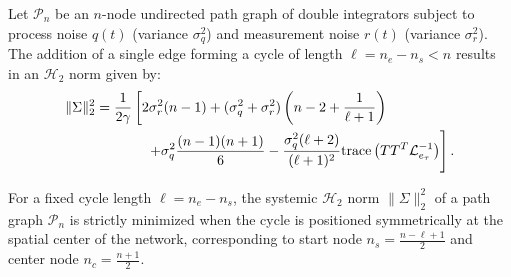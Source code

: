 \documentclass[openright,twoside]{iitbthesis}
\begin{document}
\begin{theo}\label{theo_single}
Let $\mathcal{P}_n$ be an $n$-node undirected path graph of double integrators subject to process noise $q(t)$ (variance $\sigma_q^2$) and measurement noise $r(t)$ (variance $\sigma_r^2$). The addition of a single edge forming a cycle of length $\ell = n_e - n_s < n$ results in an $\mathcal{H}_2$ norm given by:
\begin{equation}\label{eq:ch_RA_single_cycle_norm}
	\begin{aligned}
		\|\Sigma\|_2^2 = \frac{1}{2\gamma} &\left[ 2\sigma_r^2(n-1) + (\sigma_q^2 + \sigma_r^2)\left(n - 2 + \frac{1}{\ell+1}\right)  \right. \\
		&\quad \left. + \sigma_q^2 \frac{(n-1)(n+1)}{6} - \frac{\sigma_q^2(\ell+2)}{(\ell+1)^2} \text{trace}\left( T T^T \mathcal{L}_{e_{\tau}}^{-1} \right) \right].
	\end{aligned}
\end{equation}

\end{theo}
\begin{theo}\label{thm:ch_RA_single_cycle_location}
For a fixed cycle length $\ell = n_e - n_s$, the systemic $\mathcal{H}_2$ norm $\|\Sigma\|_2^2$ of a path graph $\mathcal{P}_n$ is strictly minimized when the cycle is positioned symmetrically at the spatial center of the network, corresponding to start node $n_s = \frac{n-\ell+1}{2}$ and center node $n_c = \frac{n+1}{2}$.
\end{theo}
\end{document}

